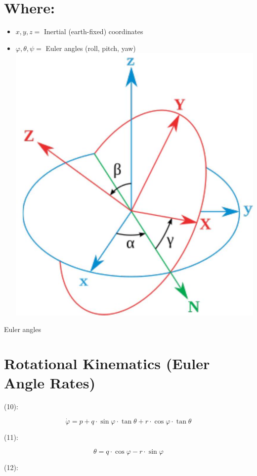 \documentclass[10pt]{article}
\begin{document}
\section*{Where:}
\begin{itemize}
  \item $x, y, z=$ Inertial (earth-fixed) coordinates
  \item $\varphi, \theta, \psi=$ Euler angles (roll, pitch, yaw)\\
\includegraphics[max width=\textwidth, center]{2025_02_14_6d0761894995bbdc62abg-2}
\end{itemize}

Euler angles

\section*{Rotational Kinematics (Euler Angle Rates)}
(10):

$$
\dot{\varphi}=p+q \cdot \sin \varphi \cdot \tan \theta+r \cdot \cos \varphi \cdot \tan \theta
$$

(11):

$$
\theta=q \cdot \cos \varphi-r \cdot \sin \varphi
$$

(12):
\end{document}
